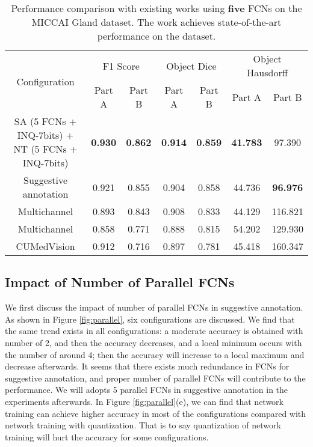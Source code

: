 \documentclass[10pt,twocolumn,letterpaper]{article}
\begin{document}
\begin{table*}[!htbp]
\centering
\caption{Performance comparison with existing works using \textbf{five} FCNs on the MICCAI Gland dataset. The work \cite{yang2017suggestive} achieves state-of-the-art performance on the dataset.}
\label{my-label}
\begin{tabular}{ccccccc}
\hline
\multirow{2}{*}{Configuration} & \multicolumn{2}{c}{F1 Score} & \multicolumn{2}{c}{Object Dice} & \multicolumn{2}{c}{Object Hausdorff} \\ \cline{2-7}
                                           & Part A  & Part B  & Part A   & Part B    & Part A    & Part B   \\ \hline
SA (5 FCNs + INQ-7bits) + NT (5 FCNs + INQ-7bits)
                 &   \textbf{0.930}	&\textbf{0.862}&	\textbf{0.914}	&\textbf{0.859}     & \textbf{41.783}     & 97.390        \\
Suggestive annotation \cite{yang2017suggestive}    &  0.921&	0.855&	0.904&	0.858     & 44.736     & \textbf{96.976}                  \\
Multichannel \cite{xu2017gland}   &  0.893&	0.843&	0.908	&0.833    & 44.129       & 116.821            \\
Multichannel \cite{xu2016gland}   &  0.858&	0.771&	0.888	&0.815    & 54.202       & 129.930            \\
CUMedVision  \cite{chen2016dcan}   &  0.912&	0.716&	0.897	&0.781    & 45.418       & 160.347            \\  \hline
\end{tabular}
\label{tab:inq-f5}
\end{table*}
\subsection{Impact of Number of Parallel FCNs}

We first discuss the impact of number of parallel FCNs in suggestive annotation.
As shown in Figure \ref{fig:parallel}, six configurations are discussed.
We find that the same trend exists in all configurations: a moderate accuracy is obtained with number of 2, and then the accuracy decreases, and a local minimum occurs with the number of around 4; then the accuracy will increase to a local maximum and decrease afterwards.
It seems that there exists much redundance in FCNs for suggestive annotation, and proper number of parallel FCNs will contribute to the performance.
We will adopts 5 parallel FCNs in suggestive annotation in the experiments afterwards.
In Figure \ref{fig:parallel}(e), we can find that network training can achieve higher accuracy in most of the configurations compared with network training with quantization.
That is to say quantization of network training will hurt the accuracy for some configurations.
\end{document}
